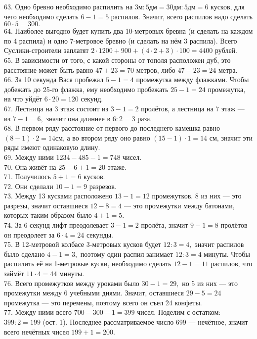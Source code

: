 63. Одно бревно необходимо распилить на $3\text{м}:5\text{дм}=30\text{дм}:5\text{дм}=6$ кусков, для чего необходимо сделать $6-1=5$ распилов. Значит, всего распилов надо сделать $60\cdot5=300.$\\
64. Наиболее выгодно будет купить два 10-метровых бревна (и сделать на каждом по 4 распила) и одно 7-метровое бревно (и сделать на нём 3 распила). Всего Суслики-строители заплатят $2\cdot1200+900+(4\cdot2+3)\cdot100=4400$ рублей.\\
65. В зависимости от того, с какой стороны от тополя расположен дуб, это расстояние может быть равно $47+23=70$ метров, либо $47-23=24$ метра.\\
66. За 10 секунда Вася пробежал $5-1=4$ промежутка между флажками. Чтобы добежать до 25-го флажка, ему необходимо пробежать $25-1=24$ промежутка, на что уйдёт $6\cdot20=120$ секунд.\\
67. Лестница на 3 этаж состоит из $3-1=2$ пролётов, а лестница на 7 этаж --- из $7-1=6,$ значит она длиннее в $6:2=3$ раза.\\
68. В первом ряду расстояние от первого до последнего камешка равно $(8-1)\cdot2=14$см, а во втором ряду оно равно $(15-1)\cdot1=14$ см, значит эти ряды имеют одинаковую длину.\\
69. Между ними $1234-485-1=748$ чисел.\\
70. Она живёт на $25-6+1=20$ этаже.\\
71. Получилось $5+1=6$ кусков.\\
72. Они сделали $10-1=9$ разрезов.\\
73. Между 13 кусками расположено $13-1=12$ промежутков. 8 из них --- это разрезы, значит оставшиеся $12-8=4$ --- это промежутки между батонами, которых таким образом было $4+1=5.$\\
74. За 6 секунд лифт преодолевает $3-1=2$ пролёта, значит $9-1=8$ пролётов он преодолеет за $6\cdot4=24$ секунды.\\
75. В 12-метровой колбасе 3-метровых кусков будет $12:3=4,$ значит распилов было сделано $4-1=3,$ поэтому один распил занимает $12:3=4$ минуты. Чтобы распилить её на 1-метровые куски, необходимо сделать $12-1=11$ распилов, что займёт $11\cdot4=44$ минуты.\\
76. Всего промежутков между уроками было $30-1=29,$ но 5 из них --- это промежутки между 6 учебными днями. Значит, оставшиеся $29-5=24$ промежутка --- это перемены, поэтому всего он съел 24 конфеты.\\
77. Между ними всего $700-300-1=399$ чисел. Поделим с остатком: $399:2=199$ (ост. 1). Последнее рассматриваемое число 699 --- нечётное, значит всего нечётных чисел $199+1=200.$\\
